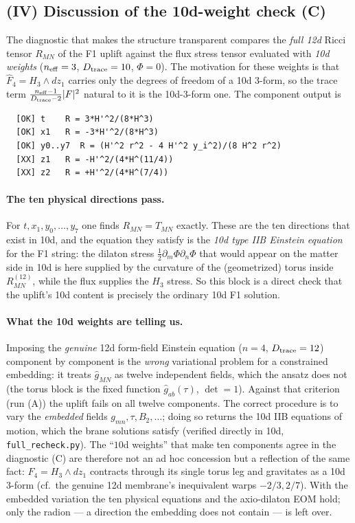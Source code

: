 \subsection*{(IV) Discussion of the 10d-weight check (C)}

The diagnostic that makes the structure transparent compares the \emph{full 12d} Ricci tensor
$R_{MN}$ of the F1 uplift against the flux stress tensor evaluated with \emph{10d weights}
($n_{\rm eff}=3$, $D_{\rm trace}=10$, $\Phi=0$). The motivation for these weights is that
$\hat F_4 = H_3\wedge dz_1$ carries only the degrees of freedom of a 10d 3-form, so the trace term
$\tfrac{n_{\rm eff}-1}{D_{\rm trace}-2}|F|^2$ natural to it is the 10d-3-form one. The component
output is
\begin{verbatim}
  [OK] t    R = 3*H'^2/(8*H^3)
  [OK] x1   R = -3*H'^2/(8*H^3)
  [OK] y0..y7  R = (H'^2 r^2 - 4 H'^2 y_i^2)/(8 H^2 r^2)
  [XX] z1   R = -H'^2/(4*H^(11/4))
  [XX] z2   R = +H'^2/(4*H^(7/4))
\end{verbatim}

\paragraph{The ten physical directions pass.} For $t,x_1,y_0,\dots,y_7$ one finds $R_{MN}=T_{MN}$
exactly. These are the ten directions that exist in 10d, and the equation they satisfy is the
\emph{10d type IIB Einstein equation} for the F1 string: the dilaton stress
$\tfrac12\partial_m\Phi\partial_n\Phi$ that would appear on the matter side in 10d is here supplied
by the curvature of the (geometrized) torus inside $R_{MN}^{(12)}$, while the flux supplies the
$H_3$ stress. So this block is a direct check that the uplift's 10d content is precisely the
ordinary 10d F1 solution.

\paragraph{What the 10d weights are telling us.} Imposing the \emph{genuine} 12d form-field
Einstein equation ($n=4$, $D_{\rm trace}=12$) component by component is the \emph{wrong} variational
problem for a constrained embedding: it treats $\hat g_{MN}$ as twelve independent fields, which the
ansatz does not (the torus block is the fixed function $\hat g_{ab}(\tau)$, $\det=1$). Against that
criterion (run (A)) the uplift fails on all twelve components. The correct procedure is to vary the
\emph{embedded} fields $g_{mn},\tau,B_2,\dots$; doing so returns the 10d IIB equations of motion,
which the brane solutions satisfy (verified directly in 10d, \texttt{full\_recheck.py}). The
``$10$d weights'' that make ten components agree in the diagnostic (C) are therefore not an ad hoc
concession but a reflection of the same fact: $\hat F_4=H_3\wedge dz_1$ contracts through its single
torus leg and gravitates as a 10d 3-form (cf.\ the genuine 12d membrane's inequivalent warps
$-2/3, 2/7$). With the embedded variation the ten physical equations and the axio-dilaton EOM hold;
only the radion --- a direction the embedding does not contain --- is left over.

